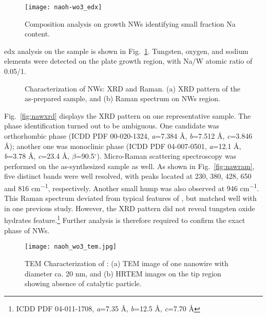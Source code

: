 \begin{figure}[htb]
\centering
\texttt{[image: naoh-wo3\_edx]}
\caption[Composition analysis on   growth NWs identifying small fraction Na content]{Composition analysis on   growth NWs identifying small fraction Na content.}
\label{fig:naohwedx}
\end{figure}
\gls{edx} analysis on the   sample is shown in Fig.~\ref{fig:naohwedx}. Tungsten, oxygen, and sodium elements were detected on the plate growth region, with Na/W atomic ratio of 0.05/1. 
\begin{figure}[htb]
\centering
{}\hspace{0.04\textwidth}
\caption[Characterization of   NWs: XRD and Raman]{Characterization of   NWs: XRD and Raman. (a) XRD pattern of the as-prepared sample, and (b) Raman spectrum on NWs region.}
\label{fig:naohwxrd}
\end{figure}

Fig.~\ref{fig:nawxrd} displays the XRD pattern on one representative sample. The phase identification turned out to be ambiguous. One candidate was orthorhombic  phase (ICDD PDF 00-020-1324, \emph{a}=7.384 \si{\angstrom}, \emph{b}=7.512 \si{\angstrom}, \emph{c}=3.846 \si{\angstrom}); another one was monoclinic  phase (ICDD PDF 04-007-0501, \emph{a}=12.1 \si{\angstrom}, \emph{b}=3.78 \si{\angstrom}, \emph{c}=23.4 \si{\angstrom}, $\beta$=90.5$^\circ$). Micro-Raman scattering spectroscopy was performed on the as-synthesized sample as well. As shown in Fig.~\ref{fig:nawram}, five distinct bands were well resolved, with peaks located at 230, 380, 428, 650 and 816 \si{cm^{-1}}, respectively. Another small hump was also observed at 946 \si{cm^{-1}}. This Raman spectrum deviated from typical features of ,\cite{Salje1975a,Dixit1986} but matched well with  in one previous study.\cite{Daniel1987} However, the XRD pattern did not reveal tungsten oxide hydrates feature.\footnote{ICDD PDF 04-011-1708, \emph{a}=7.35 \si{\angstrom}, \emph{b}=12.5 \si{\angstrom}, \emph{c}=7.70 \si{\angstrom}} Further analysis is therefore required to confirm the exact phase of   NWs.\cite{Azimirad2009a} 

\begin{figure}[htb]
\centering
\texttt{[image: naoh\_wo3\_tem.jpg]}
\caption[Characterization of  : TEM]{TEM Characterization of  : (a) TEM image of one nanowire with diameter ca. 20 nm, and (b) HRTEM images on the tip region showing absence of catalytic particle.}
\label{fig:naohwtem}
\end{figure}

